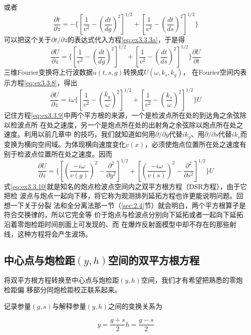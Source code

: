 或者
\begin{equation}
\frac{\partial t}{\partial z}=-\{[\frac{1}{v^2}-(\frac{dt}{dg})^2]^{1/2}+[\frac{1}{v^2}-(\frac{dt}{ds})^2]^{1/2}\}
\label{eq:ex3.3.7}
\end{equation}
可以把这个关于$\partial t/\partial z$的表达式代入方程\ref{eq:ex3.3.3a}，于是得
\begin{equation}
\frac{\partial U}{\partial z}=\{[\frac{1}{v^2}-(\frac{dt}{dg})^2]^{1/2}+[\frac{1}{v^2}-(\frac{dt}{ds})^2]^{1/2}\}\frac{\partial U}{\partial t}
\label{eq:ex3.3.8}
\end{equation}
三维Fourier变换将上行波数据$u(t,s,g)$转换成$U(\omega,k_s,k_g)$，
在Fourier空间内表示方程\ref{eq:ex3.3.8}，得出
\begin{equation}
\frac{\partial U}{\partial z}=i\omega \{[\frac{1}{v^2}-(\frac{k_g}{\omega})^2]^{1/2}+[\frac{1}{v^2}-(\frac{k_s}{\omega})^2]^{1/2}\}U
\label{eq:ex3.3.9}
\end{equation}
记住方程\ref{eq:ex3.3.9}中两个平方根的来源，一个是检波点所在处的到达角之余弦除以检波点所
在处之速度，另一个是炮点所在处的出射角之余弦除以炮点所在处之速度。利用以前几章中
的技巧，我们就知道如何用$\partial/\partial g$代替$ik_g$、用$\partial/\partial s$代替$ik_s$而变换为横向空间域。为体现横向速度变化$v(x)$，必须使炮点位置所在处之速度有别于检波点位置所在处之速度。因而
\begin{equation}
\frac{\partial U}{\partial z}=\{[(\frac{-i\omega}{v(g)})^2-\frac{\partial^2}{\partial g^2}]^{1/2}+[(\frac{-i\omega}{v(s)})^2-\frac{\partial^2}{\partial s^2}]^{1/2}\}U
\label{eq:ex3.3.10}
\end{equation}
式\ref{eq:ex3.3.10}就是知名的炮点检波点空间内之双平方根方程（DSR方程），由于它把检
波点与炮点一起向下移，将它称为观测排列延拓方程也许更能说明问题。回想一下关于分裂
法和全分离法那一节（\ref{sec:2.4}节）就会明白，两个平方根算子是符合交换律的，所以它完全等
价于炮点与检波点分别向下延拓或者一起向下延拓.沿着零炮检距时间剖面上可发现的、而
在爆炸反射面模型中却不存在的那些射线，这种方程将会产生波场。

\subsection{中心点与炮检距$(y,h)$空间的双平方根方程}
\label{sec:3.3.5}

将双平方根方程转换至中心点与炮检距$(y,h)$空间，我们才有希望把熟悉的零炮检距偏
移部分同炮检距校正联系起来。

记录参量$(g,s)$与解释参量$(y,h)$之间的变换关系为

\begin{subequations}
\begin{equation}
y=\frac{g+s}{2}
\label{eq:ex3.3.11a}
\end{equation}
\begin{equation}
h=\frac{g-s}{2}
\label{eq:ex3.3.11b}
\end{equation}
\label{eq:ex3.3.11}
\end{subequations}

